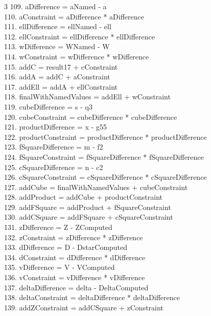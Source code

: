 \documentclass[10pt]{article}
\begin{document}
\begin{multicols}{3}
109. aDifference = aNamed - a\\
110. aConstraint = aDifference * aDifference\\
111. ellDifference = ellNamed - ell\\
112. ellConstraint = ellDifference * ellDifference\\
113. wDifference = WNamed - W\\
114. wConstraint = wDifference * wDifference\\
115. addC = result17 + cConstraint\\
116. addA = addC + aConstraint\\
117. addEll = addA + ellConstraint\\
118. finalWithNamedValues = addEll + wConstraint\\
119. cubeDifference = s - q3\\
120. cubeConstraint = cubeDifference * cubeDifference\\
121. productDifference = x - g55\\
122. productConstraint = productDifference * productDifference\\
123. fSquareDifference = m - f2\\
124. fSquareConstraint = fSquareDifference * fSquareDifference\\
125. cSquareDifference = n - c2\\
126. cSquareConstraint = cSquareDifference * cSquareDifference\\
127. addCube = finalWithNamedValues + cubeConstraint\\
128. addProduct = addCube + productConstraint\\
129. addFSquare = addProduct + fSquareConstraint\\
130. addCSquare = addFSquare + cSquareConstraint\\
131. zDifference = Z - ZComputed\\
132. zConstraint = zDifference * zDifference\\
133. dDifference = D - DstarComputed\\
134. dConstraint = dDifference * dDifference\\
135. vDifference = V - VComputed\\
136. vConstraint = vDifference * vDifference\\
137. deltaDifference = delta - DeltaComputed\\
138. deltaConstraint = deltaDifference * deltaDifference\\
139. addZConstraint = addCSquare + zConstraint\\

\end{multicols}
\end{document}
